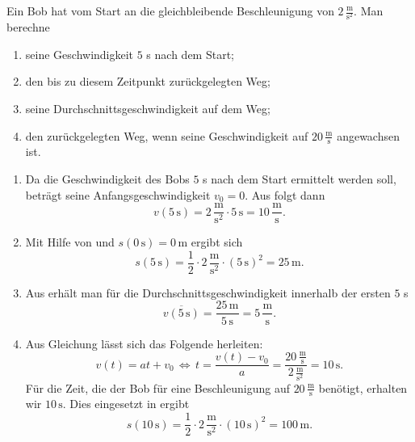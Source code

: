      \begin{MExercises}
     
     \begin{MExercise} 
     Ein Bob hat vom Start an die gleichbleibende Beschleunigung von $2\,\frac{\text{m}}{\text{s}^2}$. Man berechne
     \begin{enumerate}
     \item seine Geschwindigkeit $5$ s nach dem Start;
     \item den bis zu diesem Zeitpunkt zur\"uckgelegten Weg;
     \item seine Durchschnittsgeschwindigkeit auf dem Weg;
     \item den zur\"uckgelegten Weg, wenn seine Geschwindigkeit auf $20 \,\frac{\text{m}}{\text{s}}$ angewachsen ist.
     \end{enumerate} 
     
     \begin{MSolution}
     \begin{enumerate}
     \item Da die Geschwindigkeit des Bobs $5$ s nach dem Start ermittelt werden soll, betr\"agt seine Anfangsgeschwindigkeit $v_0=0$. Aus 
     folgt dann
     $$
     v(5\,\text{s})= 2\,\frac{\text{m}}{\text{s}^2}\cdot 5\,\text{s}=10\,\frac{\text{m}}{\text{s}}.
     $$
     \item Mit Hilfe von  und $s(0\,\text{s})=0\,\text{m}$ ergibt sich
     $$
     s(5\,\text{s})=\frac{1}{2}\cdot 2\,\frac{\text{m}}{\text{s}^2}\cdot (5\,\text{s})^2= 25\,\text{m}.
     $$
     \item Aus  erh\"alt man f\"ur die Durchschnittsgeschwindigkeit innerhalb der ersten $5$ s
     $$
     \overline{v(5\,\text{s})}=\frac{25\,\text{m}}{5\,\text{s}}=5\,\frac{\text{m}}{\text{s}}.
     $$
     \item Aus Gleichung  l\"asst sich das Folgende herleiten:
     $$
     v(t)=a t+v_0\,\Leftrightarrow\, t=\frac{v(t)-v_0}{a}=\frac{20\,\frac{\text{m}}{\text{s}}}{2\,\frac{\text{m}}{\text{s}^2}}=10 \,\text{s}.
     $$
     F\"ur die Zeit, die der Bob f\"ur eine Beschleunigung auf $20\, \frac{\text{m}}{\text{s}}$ ben\"otigt, erhalten wir $10 \,\text{s}$.
     Dies eingesetzt in  ergibt
     $$
     s(10\,\text{s})=\frac{1}{2}\cdot 2\,\frac{\text{m}}{\text{s}^2}\cdot (10\,\text{s})^2=100\,\text{m}.
     $$
     \end{enumerate}
     

\end{MSolution}
\end{MExercise}
\end{MExercises}
